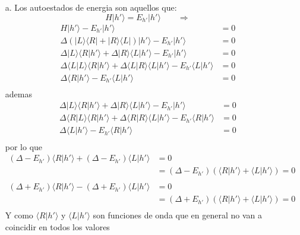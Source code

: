 \documentclass[a4paper]{article}
\begin{document}
    \begin{answer}
        \begin{itemize}
            \item [a.]Los autoestados de energia son aquellos que:
            $$H|h'\rangle = E_{h'}|h'\rangle \qquad  \Rightarrow $$
            \begin{align*}
                H|h'\rangle - E_{h'}|h'\rangle &= 0 \\
                \Delta(|L\rangle \langle R|+|R\rangle \langle L|)|h'\rangle - E_{h'}|h'\rangle &= 0 \\
                \Delta|L\rangle \langle R|h'\rangle + \Delta|R\rangle \langle L|h'\rangle - E_{h'}|h'\rangle &= 0 \\
                \Delta\langle L |L\rangle \langle R|h'\rangle + \Delta\langle L |R\rangle \langle L|h'\rangle - E_{h'}\langle L |h'\rangle &= 0 \\
                \Delta \langle R|h'\rangle - E_{h'}\langle L |h'\rangle &= 0 \\
            \end{align*}
        ademas 
        \begin{align*}
            \Delta|L\rangle \langle R|h'\rangle + \Delta|R\rangle \langle L|h'\rangle - E_{h'}|h'\rangle &= 0 \\
            \Delta\langle R |L\rangle \langle R|h'\rangle + \Delta\langle R |R\rangle \langle L|h'\rangle - E_{h'}\langle R|h'\rangle &= 0 \\
            \Delta \langle L|h'\rangle - E_{h'}\langle R |h'\rangle &= 0 \\
        \end{align*}
        por lo que
        \begin{align*}(\Delta - E_{h'}) \langle R |h'\rangle + (\Delta - E_{h'})\langle L |h'\rangle &= 0\\
            &= ( \Delta - E_{h'}) (\langle R |h'\rangle + \langle L |h'\rangle) = 0\\
        \end{align*}
        \begin{align*}(\Delta + E_{h'}) \langle R |h'\rangle - (\Delta + E_{h'})\langle L |h'\rangle &= 0\\
            &= ( \Delta + E_{h'}) (\langle R |h'\rangle + \langle L |h'\rangle) = 0\\
        \end{align*}
        Y como $\langle R |h'\rangle$ y $\langle L |h'\rangle$ son funciones de onda que en general no van a coincidir en todos los valores 

\end{itemize}
\end{answer}
\end{document}
